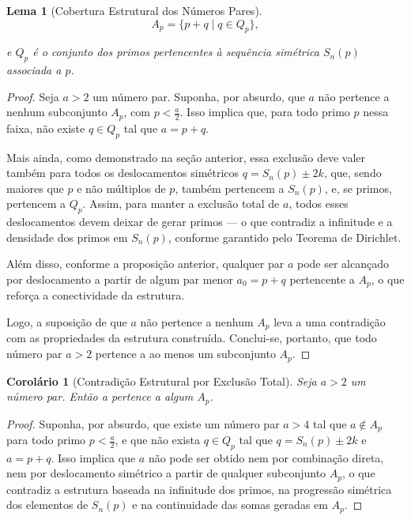 \documentclass[a4paper,11pt]{article}
\newtheorem{lemma}[theorem]{Lema}
\newtheorem{corollary}[theorem]{Corolário}
\theoremstyle{definition}
\theoremstyle{remark}
\begin{document}
\begin{otherlanguage}{brazil}
\begin{lemma}[Cobertura Estrutural dos Números Pares]
		\[
		A_p = \{p + q \mid q \in Q_p\},
		\]
		
		e \(Q_p\) é o conjunto dos primos pertencentes à sequência simétrica \(S_n(p)\) associada a \(p\).
	\end{lemma}
	
	\begin{proof}
		Seja \(a > 2\) um número par. Suponha, por absurdo, que \(a\) não pertence a nenhum subconjunto \(A_p\), com \(p < \frac{a}{2}\). Isso implica que, para todo primo \(p\) nessa faixa, não existe \(q \in Q_p\) tal que \(a = p + q\).
		
		Mais ainda, como demonstrado na seção anterior, essa exclusão deve valer também para todos os deslocamentos simétricos \(q = S_n(p) \pm 2k\), que, sendo maiores que \(p\) e não múltiplos de \(p\), também pertencem a \(S_n(p)\), e, se primos, pertencem a \(Q_p\). Assim, para manter a exclusão total de \(a\), todos esses deslocamentos devem deixar de gerar primos — o que contradiz a infinitude e a densidade dos primos em \(S_n(p)\), conforme garantido pelo Teorema de Dirichlet.
		
		Além disso, conforme a proposição anterior, qualquer par \(a\) pode ser alcançado por deslocamento a partir de algum par menor \(a_0 = p + q\) pertencente a \(A_p\), o que reforça a conectividade da estrutura.
		
		Logo, a suposição de que \(a\) não pertence a nenhum \(A_p\) leva a uma contradição com as propriedades da estrutura construída. Conclui-se, portanto, que todo número par \(a > 2\) pertence a ao menos um subconjunto \(A_p\).
	\end{proof}
	
	\begin{corollary}[Contradição Estrutural por Exclusão Total]\label{coro:contradicao_estrutural}
		Seja \(a > 2\) um número par. Então a pertence a algum \(A_p\).
	\end{corollary}
	
	\begin{proof}
		Suponha, por absurdo, que existe um número par \(a > 4\) tal que \(a \notin A_p\) para todo primo \(p < \frac{a}{2}\), e que não exista \(q \in Q_p\) tal que \(q = S_n(p) \pm 2k\) e \(a = p + q\). Isso implica que \(a\) não pode ser obtido nem por combinação direta, nem por deslocamento simétrico a partir de qualquer subconjunto \(A_p\), o que contradiz a estrutura baseada na infinitude dos primos, na progressão simétrica dos elementos de \(S_n(p)\) e na continuidade das somas geradas em \(A_p\).
		

\end{proof}
\end{otherlanguage}
\end{document}
